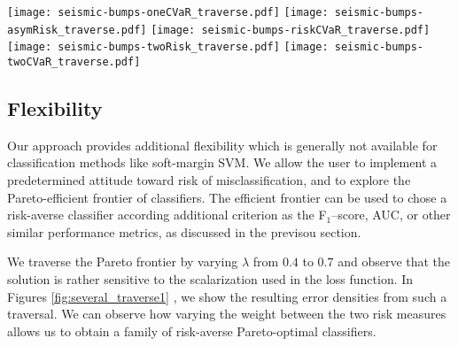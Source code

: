 \documentclass[10pt,letterpaper]{article}
\newcommand{\1}{1{\hskip -2.55 pt}\hbox{I}}
\begin{document}



\begin{figure*}[h!]
\centering
\texttt{[image: seismic-bumps-oneCVaR\_traverse.pdf]}
\texttt{[image: seismic-bumps-asymRisk\_traverse.pdf]}
\texttt{[image: seismic-bumps-riskCVaR\_traverse.pdf]}
\texttt{[image: seismic-bumps-twoRisk\_traverse.pdf]}
\texttt{[image: seismic-bumps-twoCVaR\_traverse.pdf]}
\caption{The distribution of error displayed as smoothed histogram for each of five proposed formulations for the risk-averse SVM problem e.g. ``asym\_risk'', ``one\_cvar'', ``risk\_cvar'', ``two\_risk'', and ``two\_cvar'' all
using the same set of $\lambda$ values, with other parameters fixed, on the ``seismic-bumps'' dataset}
\label{fig:several_traverse1}
\end{figure*}




\subsection{Flexibility} %
\label{sub:flexibility}



Our approach provides additional flexibility which is generally not available for classification methods like soft-margin SVM. 
We allow the user to implement a predetermined attitude toward risk of misclassification, and to explore the Pareto-efficient frontier of classifiers.
The efficient frontier can be used to chose a risk-averse classifier according additional criterion as the F$_1$--score, AUC, or other similar performance metrics, as discussed in the previsou section.

We traverse the Pareto frontier by varying $\lambda$ from $0.4$ to $0.7$ and observe that the solution is rather sensitive to the scalarization used in the loss function.
In Figures \ref{fig:several_traverse1} %
, we show the resulting error densities from such a traversal.
We can observe how varying the weight between the two risk measures allows us to obtain a family of risk-averse Pareto-optimal classifiers.
\end{document}
